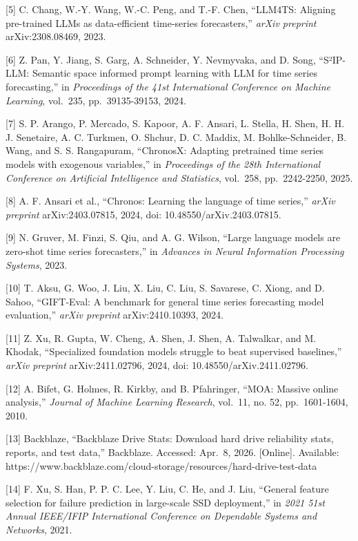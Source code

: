 \documentclass[
  11pt,
  a4paper]{article}
\begin{document}
{[}5{]} C. Chang, W.-Y. Wang, W.-C. Peng, and T.-F. Chen, ``LLM4TS:
Aligning pre-trained LLMs as data-efficient time-series forecasters,''
\emph{arXiv preprint} arXiv:2308.08469, 2023.

{[}6{]} Z. Pan, Y. Jiang, S. Garg, A. Schneider, Y. Nevmyvaka, and D.
Song, ``S²IP-LLM: Semantic space informed prompt learning with LLM for
time series forecasting,'' in \emph{Proceedings of the 41st
International Conference on Machine Learning}, vol.~235,
pp.~39135-39153, 2024.

{[}7{]} S. P. Arango, P. Mercado, S. Kapoor, A. F. Ansari, L. Stella, H.
Shen, H. H. J. Senetaire, A. C. Turkmen, O. Shchur, D. C. Maddix, M.
Bohlke-Schneider, B. Wang, and S. S. Rangapuram, ``ChronosX: Adapting
pretrained time series models with exogenous variables,'' in
\emph{Proceedings of the 28th International Conference on Artificial
Intelligence and Statistics}, vol.~258, pp.~2242-2250, 2025.

{[}8{]} A. F. Ansari et al., ``Chronos: Learning the language of time
series,'' \emph{arXiv preprint} arXiv:2403.07815, 2024, doi:
10.48550/arXiv.2403.07815.

{[}9{]} N. Gruver, M. Finzi, S. Qiu, and A. G. Wilson, ``Large language
models are zero-shot time series forecasters,'' in \emph{Advances in
Neural Information Processing Systems}, 2023.

{[}10{]} T. Aksu, G. Woo, J. Liu, X. Liu, C. Liu, S. Savarese, C. Xiong,
and D. Sahoo, ``GIFT-Eval: A benchmark for general time series
forecasting model evaluation,'' \emph{arXiv preprint} arXiv:2410.10393,
2024.

{[}11{]} Z. Xu, R. Gupta, W. Cheng, A. Shen, J. Shen, A. Talwalkar, and
M. Khodak, ``Specialized foundation models struggle to beat supervised
baselines,'' \emph{arXiv preprint} arXiv:2411.02796, 2024, doi:
10.48550/arXiv.2411.02796.

{[}12{]} A. Bifet, G. Holmes, R. Kirkby, and B. Pfahringer, ``MOA:
Massive online analysis,'' \emph{Journal of Machine Learning Research},
vol.~11, no. 52, pp.~1601-1604, 2010.

{[}13{]} Backblaze, ``Backblaze Drive Stats: Download hard drive
reliability stats, reports, and test data,'' Backblaze. Accessed:
Apr.~8, 2026. {[}Online{]}. Available:
https://www.backblaze.com/cloud-storage/resources/hard-drive-test-data

{[}14{]} F. Xu, S. Han, P. P. C. Lee, Y. Liu, C. He, and J. Liu,
``General feature selection for failure prediction in large-scale SSD
deployment,'' in \emph{2021 51st Annual IEEE/IFIP International
Conference on Dependable Systems and Networks}, 2021.
\end{document}
